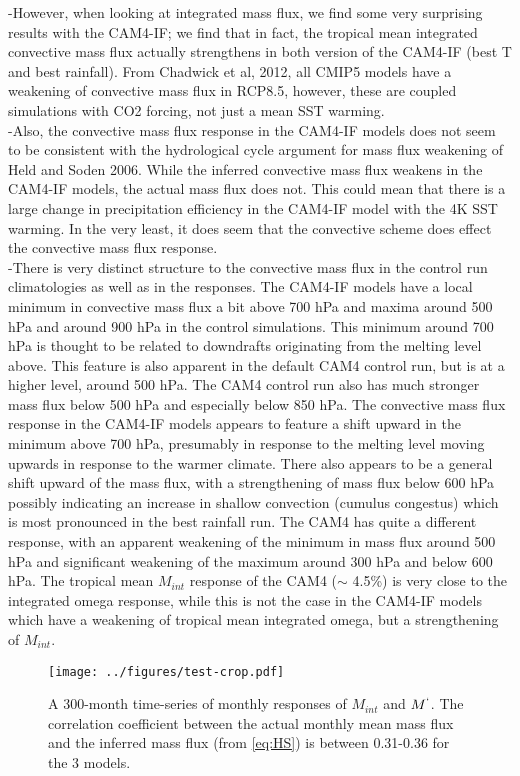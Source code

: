 \documentclass[letterpaper,12pt,titlepage,oneside,final]{book}
\begin{document}
-However, when looking at integrated mass flux, we find some very surprising results with the CAM4-IF; we find that in fact, the tropical mean integrated convective mass flux actually strengthens in both version of the CAM4-IF (best T and best rainfall). From Chadwick et al, 2012, all CMIP5 models have a weakening of convective mass flux in RCP8.5, however, these are coupled simulations with CO2 forcing, not just a mean SST warming. 
\\
-Also, the convective mass flux response in the CAM4-IF models does not seem to be consistent with the hydrological cycle argument for mass flux weakening of Held and Soden 2006. While the inferred convective mass flux weakens in the CAM4-IF models, the actual mass flux does not. This could mean that there is a large change in precipitation efficiency in the CAM4-IF model with the 4K SST warming. In the very least, it does seem that the convective scheme does effect the convective mass flux response.
\\
-There is very distinct structure to the convective mass flux in the control run climatologies as well as in the responses. The CAM4-IF models have a local minimum in convective mass flux a bit above 700 hPa and maxima around 500 hPa and around 900 hPa in the control simulations. This minimum around 700 hPa is thought to be related to downdrafts originating from the melting level above. This feature is also apparent in the default CAM4 control run, but is at a higher level, around 500 hPa. The CAM4 control run also has much stronger mass flux below 500 hPa and especially below 850 hPa. The convective mass flux response in the CAM4-IF models appears to feature a shift upward in the minimum above 700 hPa, presumably in response to the melting level moving upwards in response to the warmer climate. There also appears to be a general shift upward of the mass flux, with a strengthening of mass flux below 600 hPa possibly indicating an increase in shallow convection (cumulus congestus) which is most pronounced in the best rainfall run. The CAM4 has quite a different response, with an apparent weakening of the minimum in mass flux around 500 hPa and significant weakening of the maximum around 300 hPa and below 600 hPa. The tropical mean $M_{int}$ response of the CAM4 ($\sim$ 4.5\%) is very close to the integrated omega response, while this is not the case in the CAM4-IF models which have a weakening of tropical mean integrated omega, but a strengthening of $M_{int}$.
\begin{figure}[H]
\centering
\noindent\texttt{[image: ../figures/test-crop.pdf]}\hfill
\caption{A 300-month time-series of monthly responses of $M_{int}$ and $M^{`}$. The correlation coefficient between the actual monthly mean mass flux and the inferred mass flux (from \ref{eq:HS}) is between 0.31-0.36 for the 3 models. }
\end{figure}
\end{document}
